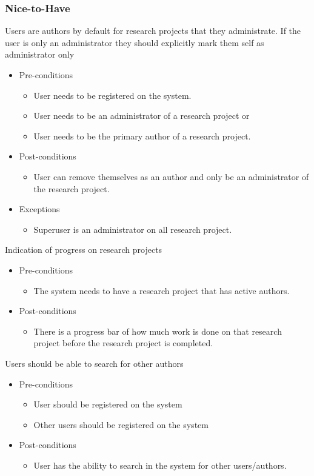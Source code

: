 \documentclass[a4paper,12pt]{report}
\begin{document}
\subsubsection{Nice-to-Have}
	Users are authors by default for research projects that they administrate. If the user is only an administrator they should explicitly mark them self as administrator only
	\begin{itemize}
		\item Pre-conditions
			\begin{itemize}
				\item User needs to be registered on the system.
				\item User needs to be an administrator of a research project or
				\item User needs to be the primary author of a research project.
			\end{itemize}
		\item Post-conditions
			\begin{itemize}
				\item User can remove themselves as an author and only be an administrator of the research project.
			\end{itemize}
		\item Exceptions
			\begin{itemize}
				\item Superuser is an administrator on all research project.
			\end{itemize}
	\end{itemize}

	Indication of progress on research projects
	\begin{itemize}
		\item Pre-conditions
			\begin{itemize}
				\item The system needs to have a research project that has active authors.
			\end{itemize}
		\item Post-conditions
			\begin{itemize}
				\item There is a progress bar of how much work is done on that research project before the research project is completed.
			\end{itemize}
	\end{itemize}

	Users should be able to search for other authors
	\begin{itemize}
		\item Pre-conditions
			\begin{itemize}
				\item User should be registered on the system
				\item Other users should be registered on the system
			\end{itemize}
		\item Post-conditions
			\begin{itemize}
				\item User has the ability to search in the system for other users/authors.
			\end{itemize}
	\end{itemize}
\end{document}
